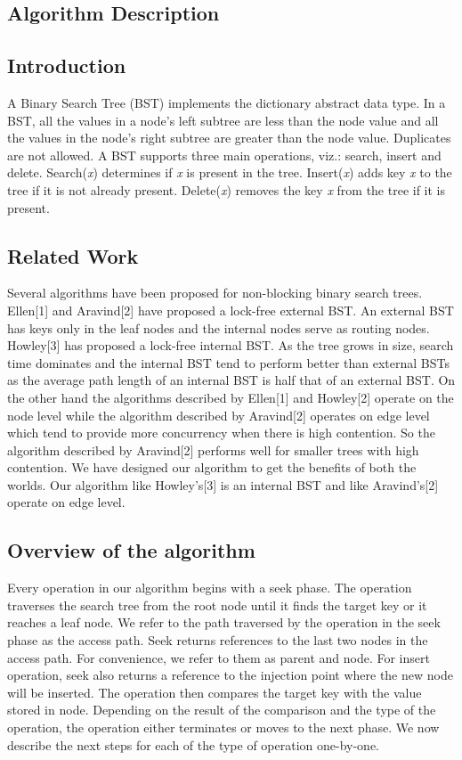 \documentclass[11pt]{article}
\begin{document}
\begin{multicols}{2}
\section{Algorithm Description}
\subsection{Introduction}
A Binary Search Tree (BST) implements the dictionary abstract data type. In a BST, all the values in a node's left subtree are less than the node value and all the values in the node's right subtree are greater than the node value. Duplicates are not allowed. A BST supports three main operations, viz.: search, insert and delete. Search(\textit{x}) determines if \textit{x} is present in the tree. Insert(\textit{x}) adds key \textit{x} to the tree if it is not already present. Delete(\textit{x}) removes the key \textit{x} from the tree if it is present.

\subsection{Related Work}
Several algorithms have been proposed for non-blocking binary search trees. Ellen[1] and Aravind[2] have proposed a lock-free external BST. An external BST has keys only in the leaf nodes and the internal nodes serve as routing nodes. Howley[3] has proposed a lock-free internal BST. As the tree grows in size, search time dominates and the internal BST tend to perform better than external BSTs as the average path length of an internal BST is half that of an external BST. On the other hand the algorithms described by Ellen[1] and Howley[2] operate on the node level while the algorithm described by Aravind[2] operates on edge level which tend to provide more concurrency when there is high contention. So the algorithm described by Aravind[2] performs well for smaller trees with high contention. We have designed our algorithm to get the benefits of both the worlds. Our algorithm like Howley's[3] is an internal BST and like Aravind's[2] operate on edge level.

\subsection{Overview of the algorithm}
Every operation in our algorithm begins with a seek phase. The operation traverses the search tree from the root node until it finds the target key or it reaches a leaf node. We refer to the path traversed by the operation in the seek phase as the access path. Seek returns references to the last two nodes in the access path. For convenience, we refer to them as parent and node. For insert operation, seek also returns a reference to the injection point where the new node will be inserted. The operation then compares the target key with the value stored in node. Depending on the result of the comparison and the type of the operation, the operation either terminates or moves to the next phase. We now describe the next steps for each of the type of operation one-by-one.


\end{multicols}
\end{document}
